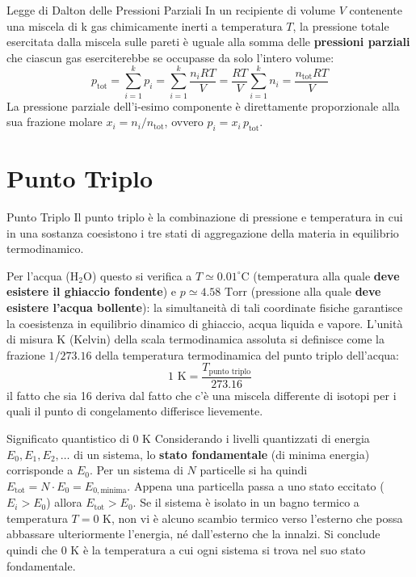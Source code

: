 \begin{teorema}{Legge di Dalton delle Pressioni Parziali}
In un recipiente di volume $V$ contenente una miscela di k gas chimicamente inerti a temperatura $T$, la pressione totale esercitata dalla miscela sulle pareti è uguale alla somma delle \textbf{pressioni parziali} che ciascun gas eserciterebbe se occupasse da solo l'intero volume:
\begin{equation}
    \boxed{ p_{\text{tot}} = \sum_{i=1}^k p_i = \sum_{i=1}^k \frac{n_i R T}{V} = \frac{R T}{V} \sum_{i=1}^k n_i = \frac{n_{\text{tot}} R T}{V} }
\end{equation}
La pressione parziale dell'i-esimo componente è direttamente proporzionale alla sua frazione molare $x_i = n_i / n_{\text{tot}}$, ovvero $p_i = x_i \, p_{\text{tot}}$.
\end{teorema}

\section{Punto Triplo}
\begin{definizione}{Punto Triplo}
Il punto triplo è la combinazione di pressione e temperatura in cui in una sostanza coesistono i tre stati di aggregazione della materia in equilibrio termodinamico.
\end{definizione}

\medskip
Per l'acqua ($\text{H}_2\text{O}$) questo si verifica a $T \simeq 0.01^\circ\text{C}$ (temperatura alla quale \textbf{deve esistere il ghiaccio fondente}) e $p \simeq 4.58 \text{ Torr}$ (pressione alla quale \textbf{deve esistere l'acqua bollente}): la simultaneità di tali coordinate fisiche garantisce la coesistenza in equilibrio dinamico di ghiaccio, acqua liquida e vapore.
L'unità di misura K (Kelvin) della scala termodinamica assoluta si definisce come la frazione $1/273.16$ della temperatura termodinamica del punto triplo dell'acqua:
\begin{equation}
    \boxed{ 1\text{ K} = \frac{T_{\text{punto triplo}}}{273.16} }
\end{equation}
il fatto che sia 16 deriva dal fatto che c'è una miscela differente di isotopi per i quali il punto di congelamento differisce lievemente.

\begin{osservazione}{Significato quantistico di $0\text{ K}$}
Considerando i livelli quantizzati di energia $E_0, E_1, E_2, \dots$ di un sistema, lo \textbf{stato fondamentale} (di minima energia) corrisponde a $E_0$.
Per un sistema di $N$ particelle si ha quindi $E_{\text{tot}} = N \cdot E_0 = E_{0,\text{minima}}$.
Appena una particella passa a uno stato eccitato ($E_i > E_0$) allora $E_{\text{tot}} > E_0$.
Se il sistema è isolato in un bagno termico a temperatura $T=0\text{ K}$, non vi è alcuno scambio termico verso l'esterno che possa abbassare ulteriormente l'energia, né dall'esterno che la innalzi. Si conclude quindi che $0\text{ K}$ è la temperatura a cui ogni sistema si trova nel suo stato fondamentale.
\end{osservazione}

